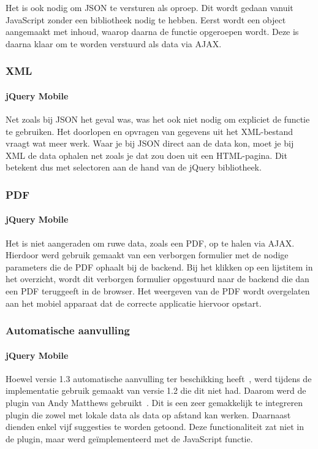 Het is ook nodig om JSON te versturen als oproep. Dit wordt gedaan vanuit JavaScript zonder een bibliotheek nodig te hebben. Eerst wordt een object aangemaakt met inhoud, waarop daarna de functie  opgeroepen wordt. Deze is daarna klaar om te worden verstuurd als data via AJAX.

\subsubsection{XML}

\paragraph{jQuery Mobile} 
Net zoals bij JSON het geval was, was het ook niet nodig om expliciet de  functie te gebruiken. Het doorlopen en opvragen van gegevens uit het XML-bestand vraagt wat meer werk. Waar je bij JSON direct aan de data kon, moet je bij XML de data ophalen net zoals je dat zou doen uit een HTML-pagina. Dit betekent dus met selectoren aan de hand van de jQuery bibliotheek.

\subsubsection{PDF}

\paragraph{jQuery Mobile} 
Het is niet aangeraden om ruwe data, zoals een PDF, op te halen via AJAX. Hierdoor werd gebruik gemaakt van een verborgen formulier met de nodige parameters die de PDF ophaalt bij de backend. Bij het klikken op een lijstitem in het overzicht, wordt dit verborgen formulier opgestuurd naar de backend die dan een PDF teruggeeft in de browser. Het weergeven van de PDF wordt overgelaten aan het mobiel apparaat dat de correcte applicatie hiervoor opstart.

\subsubsection{Automatische aanvulling}

\paragraph{jQuery Mobile} 
Hoewel versie 1.3 automatische aanvulling ter beschikking heeft~\cite{JQuery2013c}, werd tijdens de implementatie gebruik gemaakt van versie 1.2 die dit niet had. Daarom werd de plugin van Andy Matthews gebruikt~\cite{Matthews2013}. Dit is een zeer gemakkelijk te integreren plugin die zowel met lokale data als data op afstand kan werken. Daarnaast dienden enkel vijf suggesties te worden getoond. Deze functionaliteit zat niet in de plugin, maar werd geïmplementeerd met de JavaScript  functie.

